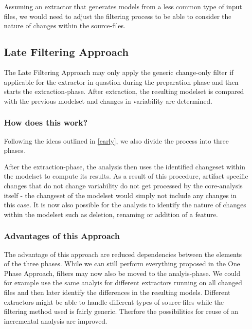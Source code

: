 \documentclass[a4paper]{article}
\begin{document}
Assuming an extractor that generates models from a less common type of input files, we would need to adjust the filtering process to be able to consider the nature of changes within the source-files.

\subsection{Late Filtering Approach} \label{late}

The Late Filtering Approach may only apply the generic change-only filter if applicable for the extractor in quastion during the preparation phase and then starts the extraction-phase. After extraction, the resulting modelset is compared with the previous modelset and changes in variability are determined.

\subsubsection{How does this work?}

Following the ideas outlined in \autoref{early}, we also divide the process into three phases.

After the extraction-phase, the analysis then uses the identified changeset within the modelset to compute its results. As a result of this procedure, artifact specific changes that do not change variability do not get processed by the core-analysis itself - the changeset of the modelset would simply not include any changes in this case. It is now also possible for the analysis to identify the nature of changes within the modelset such as deletion, renaming or addition of a feature.

\subsubsection{Advantages of this Approach}

The advantage of this approach are reduced dependencies between the elements of the three phases. While we can still perform everything proposed in the One Phase Approach, filters may now also be moved to the analyis-phase. We could for example use the same analyis for different extractors running on all changed files and then later identify the differences in the resulting models. Different extractors might be able to handle different types of source-files while the filtering method used is fairly generic. Therfore the possibilities for reuse of an incremental analysis are improved.
\end{document}
